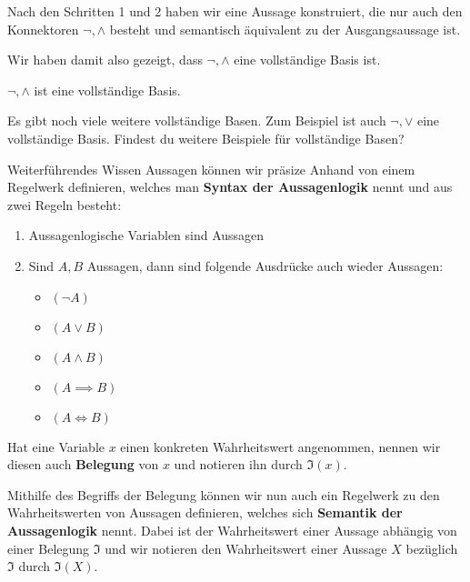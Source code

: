 \documentclass[../../main.tex]{subfiles}
\begin{document}
    Nach den Schritten 1 und 2 haben wir eine Aussage konstruiert, die nur auch 
    den Konnektoren $\lnot,\land$ besteht und semantisch äquivalent zu der 
    Ausgangsaussage ist.
    
    Wir haben damit also gezeigt, dass $\lnot,\land$ eine vollständige Basis ist.

    \begin{theorem}{}
       $\lnot,\land$ ist eine vollständige Basis.
    \end{theorem}

    Es gibt noch viele weitere vollständige Basen. Zum Beispiel ist auch 
    $\lnot,\lor$ eine vollständige Basis. Findest du 
    weitere Beispiele für vollständige Basen?

    \begin{nutshell}{Weiterführendes Wissen}
       Aussagen können wir präsize Anhand von einem Regelwerk definieren, welches 
       man \textbf{Syntax der Aussagenlogik} nennt und aus zwei Regeln besteht:
       \begin{enumerate}

        \item Aussagenlogische Variablen sind Aussagen 
        \item Sind $A,B$ Aussagen, dann sind folgende Ausdrücke auch wieder Aussagen:
            \begin{itemize}
                \item $(\lnot A)$
                \item $(A \lor B)$
                \item $(A \land B)$
                \item $(A \implies B)$
                \item $(A \iff B)$
            \end{itemize}

    \end{enumerate}
    
    Hat eine Variable $x$ einen konkreten Wahrheitswert angenommen, 
    nennen wir diesen auch \textbf{Belegung} von $x$ und notieren ihn 
    durch $\mathfrak{I}(x)$.

    Mithilfe des Begriffs der Belegung können wir nun auch ein Regelwerk zu 
    den Wahrheitswerten von Aussagen definieren, welches sich 
    \textbf{Semantik der Aussagenlogik} nennt. Dabei ist der Wahrheitswert 
    einer Aussage abhängig von einer Belegung $\mathfrak{I}$ und wir notieren 
    den Wahrheitswert einer Aussage $X$ bezüglich $\mathfrak{I}$ 
    durch $\mathfrak{I}(X)$.
    

\end{nutshell}
\end{document}
